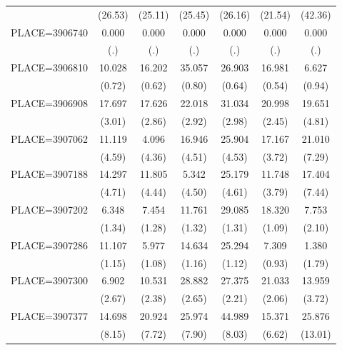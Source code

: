 {\begin{tabular}{l*{6}{c}}
                    &     (26.53)&     (25.11)&     (25.45)&     (26.16)&     (21.54)&     (42.36)\\
PLACE=3906740       &       0.000&       0.000&       0.000&       0.000&       0.000&       0.000\\
                    &         (.)&         (.)&         (.)&         (.)&         (.)&         (.)\\
PLACE=3906810       &      10.028&      16.202&      35.057&      26.903&      16.981&       6.627\\
                    &      (0.72)&      (0.62)&      (0.80)&      (0.64)&      (0.54)&      (0.94)\\
PLACE=3906908       &      17.697&      17.626&      22.018&      31.034&      20.998&      19.651\\
                    &      (3.01)&      (2.86)&      (2.92)&      (2.98)&      (2.45)&      (4.81)\\
PLACE=3907062       &      11.119&       4.096&      16.946&      25.904&      17.167&      21.010\\
                    &      (4.59)&      (4.36)&      (4.51)&      (4.53)&      (3.72)&      (7.29)\\
PLACE=3907188       &      14.297&      11.805&       5.342&      25.179&      11.748&      17.404\\
                    &      (4.71)&      (4.44)&      (4.50)&      (4.61)&      (3.79)&      (7.44)\\
PLACE=3907202       &       6.348&       7.454&      11.761&      29.085&      18.320&       7.753\\
                    &      (1.34)&      (1.28)&      (1.32)&      (1.31)&      (1.09)&      (2.10)\\
PLACE=3907286       &      11.107&       5.977&      14.634&      25.294&       7.309&       1.380\\
                    &      (1.15)&      (1.08)&      (1.16)&      (1.12)&      (0.93)&      (1.79)\\
PLACE=3907300       &       6.902&      10.531&      28.882&      27.375&      21.033&      13.959\\
                    &      (2.67)&      (2.38)&      (2.65)&      (2.21)&      (2.06)&      (3.72)\\
PLACE=3907377       &      14.698&      20.924&      25.974&      44.989&      15.371&      25.876\\
                    &      (8.15)&      (7.72)&      (7.90)&      (8.03)&      (6.62)&     (13.01)\\

\end{tabular}}
